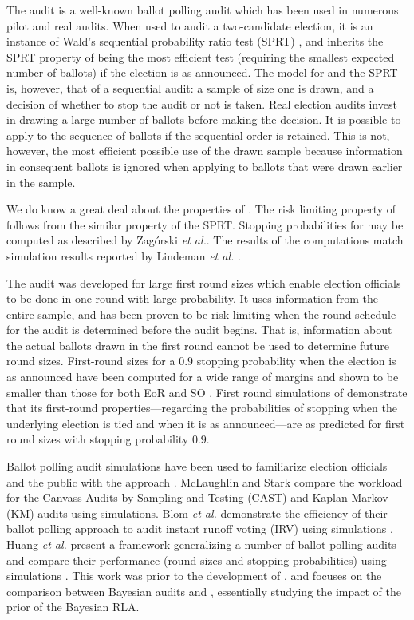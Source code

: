 The \BRAVO audit \cite{bravo} is a well-known ballot polling audit which has been used in numerous pilot and real audits. When used to audit a two-candidate election, it is an instance of Wald's sequential probability ratio test (SPRT) \cite{wald}, and inherits the SPRT property of being the most efficient test (requiring the smallest expected number of ballots) if the election is as announced. The model for \BRAVO and the SPRT is, however, that of a sequential audit: a sample of size one is drawn, and a decision of whether to stop the audit or not is taken. Real election audits invest in drawing a large number of ballots before making the decision. It is possible to apply \BRAVO to the sequence of ballots if the sequential order is retained. This is not, however, the most efficient possible use of the drawn sample because information in consequent ballots is ignored when applying \BRAVO to ballots that were drawn earlier in the sample. 

We do know a great deal about the properties of \BRAVO. The risk limiting property of \BRAVO follows from the similar property of the SPRT. Stopping probabilities for \BRAVO may be computed as described by Zag{\'o}rski {\em et al.}\cite{usenix_minerva,arxiv_athena}. The results of the computations match simulation results reported by Lindeman {\em et al.} \cite[Table 1]{bravo}.  

The \Minerva audit \cite{usenix_minerva,arxiv_athena} was developed for large first round sizes which enable election officials to be done in one round with large probability. It uses information from the entire sample, and has been proven to be risk limiting when the round schedule for the audit is determined before the audit begins. That is, information about the actual ballots drawn in the first round cannot be used to determine future round sizes. First-round sizes for a $0.9$ stopping probability when the election is as announced have been computed for a wide range of margins and shown to be smaller than those for both EoR and SO \BRAVO. First round simulations of \Minerva \cite{arxiv_athena} demonstrate that its first-round properties---regarding the probabilities of stopping when the underlying election is tied and when it is as announced---are as predicted for first round sizes with stopping probability $0.9$. 

Ballot polling audit simulations have been used to familiarize election officials and the public with the approach \cite{dice}. McLaughlin and Stark \cite{mclaughlin_thesis,simulations_house} compare the workload for the Canvass Audits by Sampling and Testing (CAST) and Kaplan-Markov (KM) audits using simulations. Blom {\em et al.} demonstrate the efficiency of their ballot polling approach to audit instant runoff voting (IRV) using simulations \cite{blom_IRV}. Huang {\em et al.} present a framework generalizing a number of ballot polling audits and compare their performance (round sizes and stopping probabilities) using simulations \cite{DBLP:conf/evoteid/HuangRSTV20}. This work was prior to the development of \Minerva, and focuses on the comparison between Bayesian audits \cite{bayesian-audits} and \BRAVO, essentially studying the impact of the prior of the Bayesian RLA. 
